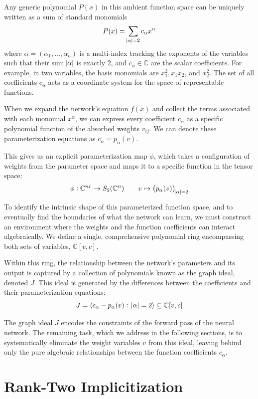 Any generic polynomial $P(x)$ in this ambient function space can be uniquely written as a sum of standard monomials 
\[
P(x) = \sum_{\abs{\alpha} = 2} c_\alpha x^\alpha
\]
where $\alpha = (\alpha_1, \dots, \alpha_n)$ is a multi-index tracking the exponents of the variables such that their sum $\abs{\alpha}$ is exactly 2, and $c_\alpha \in \mathbb{C}$ are the scalar coefficients. For example, in two variables, the basis monomials are $x_1^2, x_1x_2$, and $x_2^2$. The set of all coefficients $c_\alpha$ acts as a coordinate system for the space of representable functions. 

When we expand the network's equation $f(x)$ and collect the terms associated with each monomial $x^\alpha$, we can express every coefficient $c_\alpha$ as a specific polynomial function of the absorbed weights $v_{ij}$. We can denote these parameterization equations as $c_\alpha = p_\alpha(v)$. 

This gives us an explicit parameterization map $\phi$, which takes a configuration of weights from the parameter space and maps it to a specific function in the tensor space:
\[
\phi: \mathbb{C}^{nr} \to S_2(\mathbb{C}^n) \qquad v \mapsto \left( p_\alpha(v) \right)_{\abs{\alpha}=2}
\]

To identify the intrinsic shape of this parameterized function space, and to eventually find the boundaries of what the network can learn, we must construct an environment where the weights and the function coefficients can interact algebraically. We define a single, comprehensive polynomial ring encompassing both sets of variables, $\mathbb{C}[v, c]$. 

Within this ring, the relationship between the network's parameters and its output is captured by a collection of polynomials known as the graph ideal, denoted $J$. This ideal is generated by the differences between the coefficients and their parameterization equations:
\[
J = \langle c_\alpha - p_\alpha(v) : \; \abs{\alpha}=2 \rangle \subseteq \mathbb{C}[v, c]
\]

The graph ideal $J$  encodes the constraints of the forward pass of the neural network. The remaining task, which we address in the following sections, is to systematically eliminate the weight variables $v$ from this ideal, leaving behind only the pure algebraic relationships between the function coefficients $c_\alpha$.

\section{Rank-Two Implicitization}

